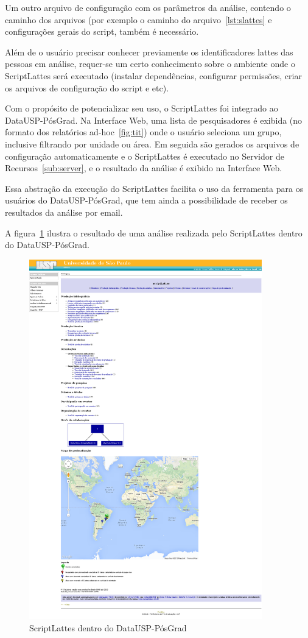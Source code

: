Um outro arquivo de configuração com os parâmetros da análise, contendo o caminho dos arquivos (por exemplo o caminho do arquivo~\ref{lst:slattes} e configurações gerais do script, também é necessário. 
\par
Além de o usuário precisar conhecer previamente os identificadores lattes das pessoas em análise, requer-se um certo conhecimento sobre o ambiente onde o ScriptLattes será executado (instalar dependências, configurar permissões, criar os arquivos de configuração do script e etc).
\par 
Com o propósito de potencializar seu uso, o ScriptLattes foi integrado ao DataUSP-PósGrad. Na Interface Web, uma lista de pesquisadores é exibida (no formato dos relatórios ad-hoc~\ref{fig:tit}) onde o usuário seleciona um grupo, inclusive filtrando por unidade ou área. Em seguida são gerados os arquivos de configuração automaticamente e o ScriptLattes
é executado no Servidor de Recursos~\ref{sub:server}, e o resultado da análise é exibido na Interface Web.
\par 
Essa abstração da execução do ScriptLattes facilita o uso da ferramenta para os usuários do DataUSP-PósGrad, que tem ainda a possibilidade de receber os resultados da análise por email.
\par
A figura~\ref{fig:ldta} ilustra o resultado de uma análise realizada pelo ScriptLattes dentro do DataUSP-PósGrad.
\begin{figure}[H]
    \centering \includegraphics[width=0.9\textwidth]{figuras/lattes.png}
    \caption{ScriptLattes dentro do DataUSP-PósGrad}
    \label{fig:ldta}
\end{figure}
\vfill

